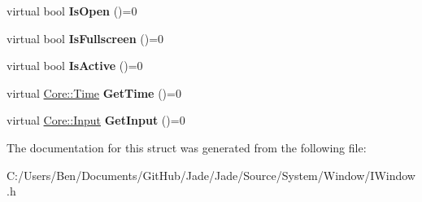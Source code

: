 \begin{DoxyCompactItemize}
\item 
\hypertarget{struct_jade_1_1_system_1_1_i_window_a334e475db667839044a87d17452c85e8}{}virtual bool {\bfseries Is\+Open} ()=0\label{struct_jade_1_1_system_1_1_i_window_a334e475db667839044a87d17452c85e8}

\item 
\hypertarget{struct_jade_1_1_system_1_1_i_window_a1431c2abbaf150947bbd2321d194c298}{}virtual bool {\bfseries Is\+Fullscreen} ()=0\label{struct_jade_1_1_system_1_1_i_window_a1431c2abbaf150947bbd2321d194c298}

\item 
\hypertarget{struct_jade_1_1_system_1_1_i_window_a2ed18cb232956c62866a853c7f99355d}{}virtual bool {\bfseries Is\+Active} ()=0\label{struct_jade_1_1_system_1_1_i_window_a2ed18cb232956c62866a853c7f99355d}

\item 
\hypertarget{struct_jade_1_1_system_1_1_i_window_a7ec89541f3839eba001150de210d365a}{}virtual \hyperlink{class_jade_1_1_core_1_1_time}{Core\+::\+Time} {\bfseries Get\+Time} ()=0\label{struct_jade_1_1_system_1_1_i_window_a7ec89541f3839eba001150de210d365a}

\item 
\hypertarget{struct_jade_1_1_system_1_1_i_window_a117186f37258b80db6018f87ee0ae9dd}{}virtual \hyperlink{struct_jade_1_1_core_1_1_input}{Core\+::\+Input} {\bfseries Get\+Input} ()=0\label{struct_jade_1_1_system_1_1_i_window_a117186f37258b80db6018f87ee0ae9dd}

\end{DoxyCompactItemize}


The documentation for this struct was generated from the following file\+:\begin{DoxyCompactItemize}
\item 
C\+:/\+Users/\+Ben/\+Documents/\+Git\+Hub/\+Jade/\+Jade/\+Source/\+System/\+Window/I\+Window.\+h\end{DoxyCompactItemize}
